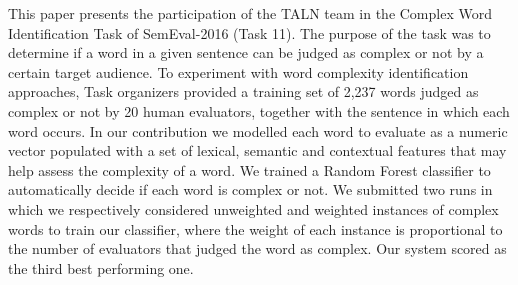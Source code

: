 This paper presents the participation of the TALN team in the Complex Word Identification Task of SemEval-2016 (Task 11). The purpose of the task was to determine if a word in a given sentence can be judged as complex or not by a certain target audience. To experiment with word complexity identification approaches, Task organizers provided a training set of 2,237 words judged as complex or not by 20 human evaluators, together with the sentence in which each word occurs. In our contribution we modelled each word to evaluate as a numeric vector populated with a set of lexical, semantic and contextual features that may help assess the complexity of a word. We trained a Random Forest classifier to automatically decide if each word is complex or not. We submitted two runs in which we respectively considered unweighted and weighted instances of complex words to train our classifier, where the weight of each instance is proportional to the number of evaluators that judged the word as complex. Our system scored as the third best performing one.
